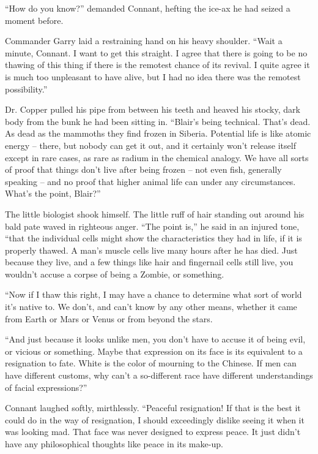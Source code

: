 \documentclass[ebook,oneside,11pt]{memoir}				%
\begin{document}
``How do you know?'' demanded Connant, hefting the ice-ax he had seized a moment before.

Commander Garry laid a restraining hand on his heavy shoulder. ``Wait a minute, Connant. I want to get this straight. I agree that there is going to be no thawing of this thing if there is the remotest chance of its revival. I quite agree it is much too unpleasant to have alive, but I had no idea there was the remotest possibility.''

Dr. Copper pulled his pipe from between his teeth and heaved his stocky, dark body from the bunk he had been sitting in. ``Blair's being technical. That's dead. As dead as the mammoths they find frozen in Siberia. Potential life is like atomic energy -- there, but nobody can get it out, and it certainly won't release itself except in rare cases, as rare as radium in the chemical analogy. We have all sorts of proof that things don't live after being frozen -- not even fish, generally speaking -- and no proof that higher animal life can under any circumstances. What's the point, Blair?''

The little biologist shook himself. The little ruff of hair standing out around his bald pate waved in righteous anger. ``The point is,'' he said in an injured tone, ``that the individual cells might show the characteristics they had in life, if it is properly thawed. A man's muscle cells live many hours after he has died. Just because they live, and a few things like hair and fingernail cells still live, you wouldn't accuse a corpse of being a Zombie, or something.

``Now if I thaw this right, I may have a chance to determine what sort of world it's native to. We don't, and can't know by any other means, whether it came from Earth or Mars or Venus or from beyond the stars.

``And just because it looks unlike men, you don't have to accuse it of being evil, or vicious or something. Maybe that expression on its face is its equivalent to a resignation to fate. White is the color of mourning to the Chinese. If men can have different customs, why can't a so-different race have different understandings of facial expressions?''

Connant laughed softly, mirthlessly. ``Peaceful resignation! If that is the best it could do in the way of resignation, I should exceedingly dislike seeing it when it was looking mad. That face was never designed to express peace. It just didn't have any philosophical thoughts like peace in its make-up.
\end{document}
